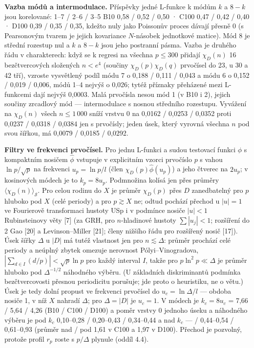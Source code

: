 \documentclass[
  10pt,
]{article}
\begin{document}
\textbf{Vazba módů a intermodulace.} Příspěvky jedné L-funkce k módům
\(k\) a \(8 - k\) jsou korelované: 1--7 / 2--6 / 3--5 B10 0,58 / 0,52 /
0,50 · C100 0,47 / 0,42 / 0,40 · D100 0,39 / 0,35 / 0,35, kdežto nuly
jako Poissonův proces dávají přesně 0 (s Pearsonovým tvarem je jejich
kovariance \(N\)-násobek jednotkové matice). Mód 8 je střední rozestup
nul a \(k\) a \(8 - k\) jsou jeho postranní pásma. Vazba je druhého řádu
v charakterech: když se k regresi na všechna \(p \le 300\) přidají
\(\chi_D(n)\) 16 bezčtvercových složených \(n < e^4\) (součiny
\(\chi_D(p)\chi_D(q)\) prvočísel do 23, u 30 a 42 tří), vzroste
vysvětlený podíl módu 7 o 0,188 / 0,111 / 0,043 a módu 6 o 0,152 / 0,019
/ 0,006, módů 1--4 nejvýš o 0,026; tytéž příznaky přeházené mezi
L-funkcemi dají nejvýš 0,0003. Malá prvočísla nesou mód 1 (v B10 i 2),
jejich součiny zrcadlový mód --- intermodulace s nosnou středního
rozestupu. Vyvážení na \(\chi_D(n)\) všech \(n \le 1\,000\) sníží vrstvu
0 na 0,0162 / 0,0253 / 0,0352 proti 0,0237 / 0,0318 / 0,0384 jen s
prvočísly; jeden úsek, který vyrovná všechna \(n\) pod svou šířkou, má
0,0079 / 0,0185 / 0,0292.

\textbf{Filtry ve frekvenci prvočísel.} Pro jednu L-funkci a sudou
testovací funkci \(\phi\) s kompaktním nosičem \(\hat\phi\) vstupuje v
explicitním vzorci prvočíslo \(p\) s vahou \(\ln p/\sqrt p\) na
frekvenci \(u_p = \ln p/l\) (člen \(\chi_D(p)\hat\phi(u_p)\)) a jeho
čtverec na \(2u_p\); v kosinových módech je to \(k_p = 8u_p\).
Podmnožina kolísá jen přes průměry
\(\langle\chi_D(n)\rangle_{\mathcal S}\). Pro celou rodinu do \(X\) je
průměr \(\chi_D(p)\) přes \(D\) zanedbatelný pro \(p\) hluboko pod \(X\)
(celé periody) a pro \(p \gtrsim X\) ne; odtud pochází přechod u
\(|u| = 1\) ve Fourierově transformaci hustoty USp i v podmínce nosiče
\(|u| < 1\) Rubinsteinovy věty {[}7{]} (za GRH, pro \(n\)-hladinové
hustoty \(\sum|u_j| < 1\); rozšíření do 2 Gao {[}20{]} a
Levinson--Miller {[}21{]}; členy nižšího řádu pro rozšířený nosič
{[}17{]}). Úsek šířky \(\Delta\) u \(|D|\) má tutéž vlastnost jen pro
\(n \lesssim \Delta\): průměr prochází celé periody a neúplný zbytek
omezuje nerovnost Pólyi--Vinogradova,
\(|\sum_{d \in I}(d/p)| < \sqrt p\ln p\) pro každý interval \(I\), takže
pro \(p\ln^2 p \ll \Delta\) je průměr hluboko pod \(\Delta^{-1/2}\)
náhodného výběru. (U základních diskriminantů podmínka bezčtvercovosti
přesnou periodicitu porušuje; jde proto o heuristiku, ne o větu.) Úsek
je tedy dolní propust ve frekvenci prvočísel do \(u_c = \ln\Delta/l\)
--- obdoba nosiče 1, v níž \(X\) nahradí \(\Delta\); pro
\(\Delta = |D|\) je \(u_c = 1\). V módech je \(k_c = 8u_c\) = 7,66 /
5,64 / 4,26 (B10 / C100 / D100) a poměr vrstvy 0 jednoho úseku a
náhodného výběru je pod \(k_c\) 0,10--0,28 / 0,20--0,43 / 0,34--0,44 a
nad \(k_c\) --- / 0,44--0,54 / 0,61--0,93 (průměr nad / pod 1,61 v C100
a 1,97 v D100). Přechod je pozvolný, protože profil \(r_p\) roste s
\(p/\Delta\) plynule (oddíl 4.4).
\end{document}
